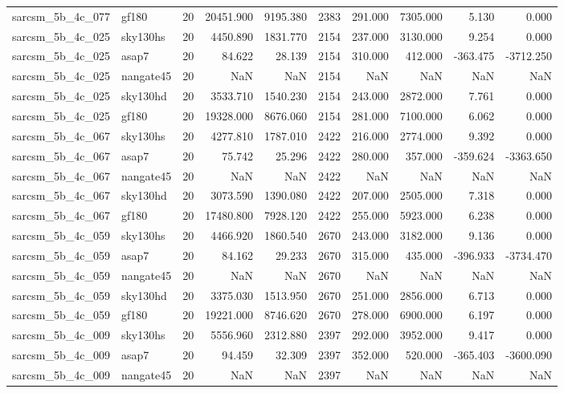 \documentclass{article}
\begin{document}
\begin{longtable}{llrrrrrrrr}
sarcsm\_5b\_4c\_077 & gf180 & 20 & 20451.900 & 9195.380 & 2383 & 291.000 & 7305.000 & 5.130 & 0.000 \\
sarcsm\_5b\_4c\_025 & sky130hs & 20 & 4450.890 & 1831.770 & 2154 & 237.000 & 3130.000 & 9.254 & 0.000 \\
sarcsm\_5b\_4c\_025 & asap7 & 20 & 84.622 & 28.139 & 2154 & 310.000 & 412.000 & -363.475 & -3712.250 \\
sarcsm\_5b\_4c\_025 & nangate45 & 20 & NaN & NaN & 2154 & NaN & NaN & NaN & NaN \\
sarcsm\_5b\_4c\_025 & sky130hd & 20 & 3533.710 & 1540.230 & 2154 & 243.000 & 2872.000 & 7.761 & 0.000 \\
sarcsm\_5b\_4c\_025 & gf180 & 20 & 19328.000 & 8676.060 & 2154 & 281.000 & 7100.000 & 6.062 & 0.000 \\
sarcsm\_5b\_4c\_067 & sky130hs & 20 & 4277.810 & 1787.010 & 2422 & 216.000 & 2774.000 & 9.392 & 0.000 \\
sarcsm\_5b\_4c\_067 & asap7 & 20 & 75.742 & 25.296 & 2422 & 280.000 & 357.000 & -359.624 & -3363.650 \\
sarcsm\_5b\_4c\_067 & nangate45 & 20 & NaN & NaN & 2422 & NaN & NaN & NaN & NaN \\
sarcsm\_5b\_4c\_067 & sky130hd & 20 & 3073.590 & 1390.080 & 2422 & 207.000 & 2505.000 & 7.318 & 0.000 \\
sarcsm\_5b\_4c\_067 & gf180 & 20 & 17480.800 & 7928.120 & 2422 & 255.000 & 5923.000 & 6.238 & 0.000 \\
sarcsm\_5b\_4c\_059 & sky130hs & 20 & 4466.920 & 1860.540 & 2670 & 243.000 & 3182.000 & 9.136 & 0.000 \\
sarcsm\_5b\_4c\_059 & asap7 & 20 & 84.162 & 29.233 & 2670 & 315.000 & 435.000 & -396.933 & -3734.470 \\
sarcsm\_5b\_4c\_059 & nangate45 & 20 & NaN & NaN & 2670 & NaN & NaN & NaN & NaN \\
sarcsm\_5b\_4c\_059 & sky130hd & 20 & 3375.030 & 1513.950 & 2670 & 251.000 & 2856.000 & 6.713 & 0.000 \\
sarcsm\_5b\_4c\_059 & gf180 & 20 & 19221.000 & 8746.620 & 2670 & 278.000 & 6900.000 & 6.197 & 0.000 \\
sarcsm\_5b\_4c\_009 & sky130hs & 20 & 5556.960 & 2312.880 & 2397 & 292.000 & 3952.000 & 9.417 & 0.000 \\
sarcsm\_5b\_4c\_009 & asap7 & 20 & 94.459 & 32.309 & 2397 & 352.000 & 520.000 & -365.403 & -3600.090 \\
sarcsm\_5b\_4c\_009 & nangate45 & 20 & NaN & NaN & 2397 & NaN & NaN & NaN & NaN \\

\end{longtable}
\end{document}
